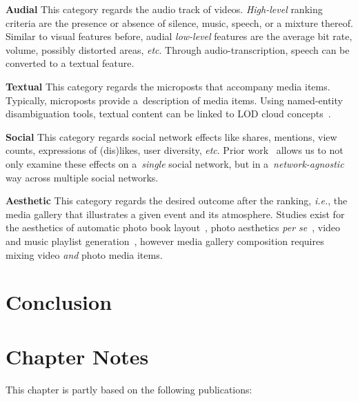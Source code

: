 \noindent \textbf{Audial}
This category regards the audio track of videos.
\emph{High-level} ranking criteria are the presence or absence
of silence, music, speech, or a mixture thereof.
Similar to visual features before,
audial \emph{low-level} features are the average bit rate,
volume, possibly distorted areas, \emph{etc}.
Through audio-transcription, speech can be converted to a textual feature.

\noindent \textbf{Textual}
This category regards the microposts that accompany media items.
Typically, microposts provide a~description of media items.
Using named-entity disambiguation tools,
textual content can be linked to LOD cloud concepts~\cite{Facebook2011}.

\noindent \textbf{Social}
This category regards social network effects like shares, mentions,
view counts, expressions of (dis)likes, user diversity, \emph{etc}.
Prior work~\cite{Khrouf2012} allows us to not only examine these effects
on a~\emph{single} social network,
but in a~\emph{network-agnostic} way across multiple social networks.

\noindent \textbf{Aesthetic}
This category regards the desired outcome after the ranking, \emph{i.e.},
the media gallery that illustrates a given event and its atmosphere.
Studies exist for the aesthetics of
automatic photo book layout~\cite{Photo2011},
photo aesthetics \emph{per se}~\cite{Photo2012},
video and music playlist generation~\cite{YouTube2010,Playlist2006},
however media gallery composition requires mixing video
\emph{and} photo media items.

\section{Conclusion}

\section*{Chapter Notes}
This chapter is partly based on the following publications:
